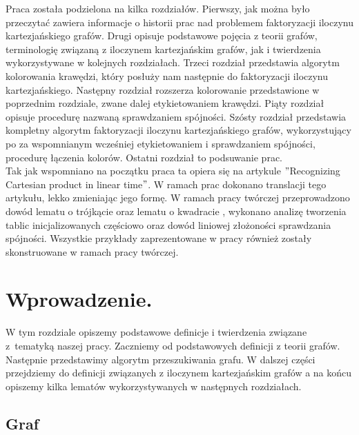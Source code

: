 \documentclass[12pt,a4paper,titlepage]{article}
\begin{document}
Praca została podzielona na kilka rozdziałów. Pierwszy, jak można było przeczytać zawiera informacje o historii prac nad problemem faktoryzacji iloczynu kartezjańskiego grafów. Drugi opisuje podstawowe pojęcia z teorii grafów, terminologię związaną z iloczynem kartezjańskim grafów, jak i twierdzenia wykorzystywane w kolejnych rozdziałach. Trzeci rozdział przedstawia algorytm kolorowania krawędzi, który posłuży nam następnie do faktoryzacji iloczynu kartezjańskiego. Następny rozdział rozszerza kolorowanie przedstawione w poprzednim rozdziale, zwane dalej etykietowaniem krawędzi. Piąty rozdział opisuje procedurę nazwaną sprawdzaniem spójności. Szósty rozdział przedstawia kompletny algorytm faktoryzacji iloczynu kartezjańskiego grafów, wykorzystujący po za wspomnianym wcześniej etykietowaniem i sprawdzaniem spójności, procedurę łączenia kolorów. Ostatni rozdział to podsuwanie prac. \\

Tak jak wspomniano na początku praca ta opiera się na artykule $"$Recognizing Cartesian product in linear time$"$. W ramach prac dokonano translacji tego artykułu, lekko zmieniając jego formę. W ramach pracy twórczej przeprowadzono dowód lematu o trójkącie oraz lematu o kwadracie , wykonano analizę tworzenia tablic inicjalizowanych częściowo oraz dowód liniowej złożoności sprawdzania spójności. Wszystkie przykłady zaprezentowane w pracy również zostały skonstruowane w ramach pracy twórczej.
\newpage

\section{Wprowadzenie.}
W tym rozdziale opiszemy podstawowe definicje i twierdzenia związane z~tematyką naszej pracy. Zaczniemy od podstawowych definicji z teorii grafów. Następnie przedstawimy algorytm przeszukiwania grafu. W dalszej części przejdziemy do definicji związanych z iloczynem kartezjańskim grafów a na końcu opiszemy kilka lematów wykorzystywanych w następnych rozdziałach.
\subsection{Graf}
\end{document}
